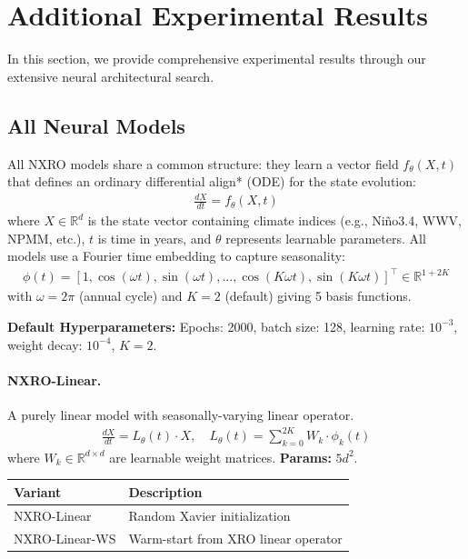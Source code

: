 \section{Additional Experimental Results}


In this section, we provide comprehensive experimental results through our extensive neural architectural search. 



\subsection{All Neural Models} \label{app:a1}

All NXRO models share a common structure: they learn a vector field $f_\theta(X, t)$ that defines an ordinary differential align* (ODE) for the state evolution:
\begin{align*}
    \frac{dX}{dt} = f_\theta(X, t)
\end{align*}
where $X \in \mathbb{R}^d$ is the state vector containing climate indices (e.g., Ni\~no3.4, WWV, NPMM, etc.), $t$ is time in years, and $\theta$ represents learnable parameters. All models use a Fourier time embedding to capture seasonality:
\begin{align*}
    \phi(t) = \left[1, \cos(\omega t), \sin(\omega t), \ldots, \cos(K\omega t), \sin(K\omega t)\right]^\top \in \mathbb{R}^{1+2K}
\end{align*}
with $\omega = 2\pi$ (annual cycle) and $K=2$ (default) giving 5 basis functions.

\textbf{Default Hyperparameters:} Epochs: 2000, batch size: 128, learning rate: $10^{-3}$, weight decay: $10^{-4}$, $K=2$.

\paragraph{NXRO-Linear.}
A purely linear model with seasonally-varying linear operator.
\begin{align*}
    \frac{dX}{dt} = L_\theta(t) \cdot X, \quad L_\theta(t) = \sum_{k=0}^{2K} W_k \cdot \phi_k(t)
\end{align*}
where $W_k \in \mathbb{R}^{d \times d}$ are learnable weight matrices. \textbf{Params:} $5d^2$.

\begin{tabular}{@{}ll@{}}
\textbf{Variant} & \textbf{Description} \\
\hline
NXRO-Linear & Random Xavier initialization \\
NXRO-Linear-WS & Warm-start from XRO linear operator \\
\end{tabular}

